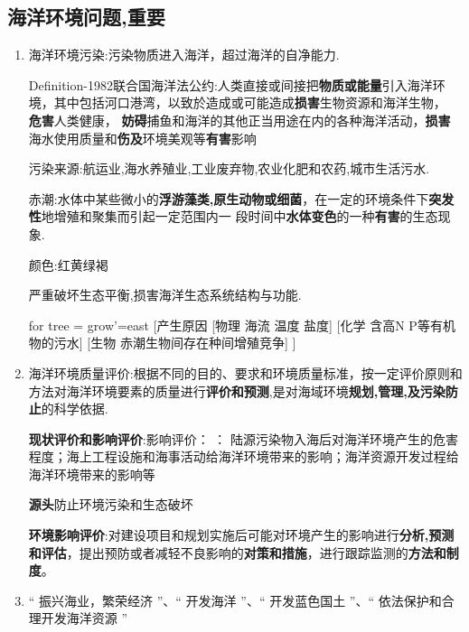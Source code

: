 	\subsection{海洋环境问题,重要}
		\begin{enumerate}
			\item 海洋环境污染:污染物质进入海洋，超过海洋的自净能力.
			
			Definition-1982联合国海洋法公约:人类直接或间接把\textbf{物质或能量}引入海洋环境，其中包括河口港湾，以致於造成或可能造成\textbf{损害}生物资源和海洋生物， \textbf{危害}人类健康， \textbf{妨碍}捕鱼和海洋的其他正当用途在内的各种海洋活动，\textbf{损害}海水使用质量和\textbf{伤及}环境美观等\textbf{有害}影响
			
			污染来源:航运业,海水养殖业,工业废弃物,农业化肥和农药,城市生活污水.
			
			赤潮:水体中某些微小的\textbf{浮游藻类,原生动物或细菌}，在一定的环境条件下\textbf{突发性}地增殖和聚集而引起一定范围内一
			段时间中\textbf{水体变色}的一种\textbf{有害}的生态现象.
			
			{}颜色:红黄绿褐
			
			{}严重破坏生态平衡,损害海洋生态系统结构与功能.
			
			\begin{forest}
				for tree = {grow'=east}
				[产生原因
					[物理 {} 海流 温度 盐度]
					[化学 {}含高N P等有机物的污水]
					[生物 {}赤潮生物间存在种间增殖竞争]
					]
			\end{forest}
			\item 海洋环境质量评价:根据不同的目的、要求和环境质量标准，按一定评价原则和方法对海洋环境要素的质量进行\textbf{评价和预测},是对海域环境\textbf{规划,管理,及污染防止}的科学依据. 
			
			\textbf{现状评价和影响评价}:影响评价： ： 陆源污染物入海后对海洋环境产生的危害程度；海上工程设施和海事活动给海洋环境带来的影响；海洋资源开发过程给海洋环境带来的影响等
			
			\textbf{源头}防止环境污染和生态破坏
			
			\textbf{环境影响评价}:对建设项目和规划实施后可能对环境产生的影响进行\textbf{分析,预测和评估}，提出预防或者减轻不良影响的\textbf{对策和措施}，进行跟踪监测的\textbf{方法和制度}。 
			
			\item “ 振兴海业，繁荣经济 ”、“ 开发海洋 ”、“ 开发蓝色国土 ”、“ 依法保护和合理开发海洋资源 ”
		\end{enumerate}